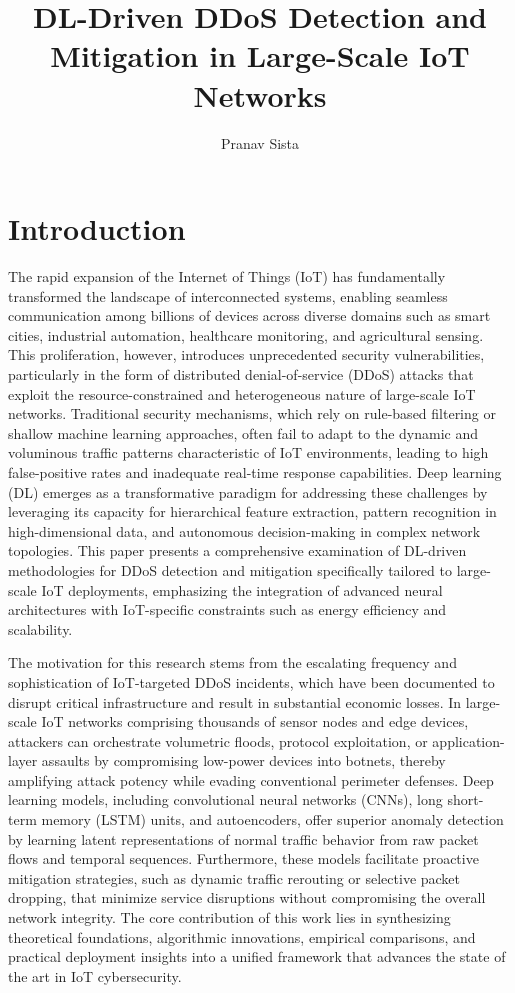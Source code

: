 \documentclass[12pt]{article}
\begin{document}
\title{DL-Driven DDoS Detection and Mitigation in Large-Scale IoT Networks}
\author{Pranav Sista}
\date{}

\maketitle

\section{Introduction}

The rapid expansion of the Internet of Things (IoT) has fundamentally transformed the landscape of interconnected systems, enabling seamless communication among billions of devices across diverse domains such as smart cities, industrial automation, healthcare monitoring, and agricultural sensing. This proliferation, however, introduces unprecedented security vulnerabilities, particularly in the form of distributed denial-of-service (DDoS) attacks that exploit the resource-constrained and heterogeneous nature of large-scale IoT networks. Traditional security mechanisms, which rely on rule-based filtering or shallow machine learning approaches, often fail to adapt to the dynamic and voluminous traffic patterns characteristic of IoT environments, leading to high false-positive rates and inadequate real-time response capabilities. Deep learning (DL) emerges as a transformative paradigm for addressing these challenges by leveraging its capacity for hierarchical feature extraction, pattern recognition in high-dimensional data, and autonomous decision-making in complex network topologies. This paper presents a comprehensive examination of DL-driven methodologies for DDoS detection and mitigation specifically tailored to large-scale IoT deployments, emphasizing the integration of advanced neural architectures with IoT-specific constraints such as energy efficiency and scalability.

The motivation for this research stems from the escalating frequency and sophistication of IoT-targeted DDoS incidents, which have been documented to disrupt critical infrastructure and result in substantial economic losses. In large-scale IoT networks comprising thousands of sensor nodes and edge devices, attackers can orchestrate volumetric floods, protocol exploitation, or application-layer assaults by compromising low-power devices into botnets, thereby amplifying attack potency while evading conventional perimeter defenses. Deep learning models, including convolutional neural networks (CNNs), long short-term memory (LSTM) units, and autoencoders, offer superior anomaly detection by learning latent representations of normal traffic behavior from raw packet flows and temporal sequences. Furthermore, these models facilitate proactive mitigation strategies, such as dynamic traffic rerouting or selective packet dropping, that minimize service disruptions without compromising the overall network integrity. The core contribution of this work lies in synthesizing theoretical foundations, algorithmic innovations, empirical comparisons, and practical deployment insights into a unified framework that advances the state of the art in IoT cybersecurity.
\end{document}

